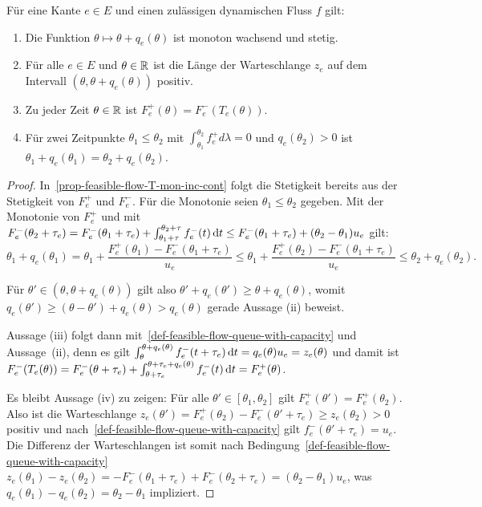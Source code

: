 \begin{proposition}\label{prop-feasible-flow}
	Für eine Kante $e\in E$ und einen zulässigen dynamischen Fluss $f$ gilt:
	\begin{enumerate}[label=(\roman*)]
		\item\label{prop-feasible-flow-T-mon-inc-cont} Die Funktion $\theta \mapsto \theta + q_e(\theta)$ ist monoton wachsend und stetig.
		\item\label{prop-feasible-flow-positive-queue} Für alle $e\in E$ und $\theta\in\mathbb{R}$ ist die Länge der Warteschlange $z_e$ auf dem Intervall $(\theta, \theta + q_e(\theta))$ positiv.
		\item\label{prop-feasible-flow-det-outflow} Zu jeder Zeit $\theta\in\mathbb{R}$ ist $F_e^+(\theta) = F_e^-(T_e(\theta))$.
		\item\label{prop-feasible-flow-queue-delay} Für zwei Zeitpunkte $\theta_1 \leq \theta_2$ mit $\int_{\theta_1}^{\theta_2} f^+_e d\lambda = 0$ und $q_e(\theta_2)>0$ ist $\theta_1 + q_e(\theta_1) = \theta_2 + q_e(\theta_2)$.
	\end{enumerate}
\end{proposition}
\begin{proof}
	In~\ref{prop-feasible-flow-T-mon-inc-cont} folgt die Stetigkeit bereits aus der Stetigkeit von $F_e^+$ und $F_e^-$.
	Für die Monotonie seien $\theta_1 \leq \theta_2$ gegeben.
	Mit der Monotonie von $F_e^+$ und mit $F_e^-(\theta_2 + \tau_e) = F_e^-(\theta_1+\tau_e) + \int_{\theta_1+\tau}^{\theta_2+\tau} f_e^-(t)\mathop{}\!\mathrm{d} t\leq F_e^-(\theta_1 + \tau_e) + (\theta_2 - \theta_1)u_e$ gilt: 
	$$
		\theta_1 + q_e(\theta_1)
		= \theta_1 + \frac{F_e^+(\theta_1) - F_e^-(\theta_1 + \tau_e)}{u_e}
		\leq \theta_1 + \frac{F_e^+(\theta_2) - F_e^-(\theta_1+\tau_e)}{u_e} \leq \theta_2 + q_e(\theta_2).
	$$
	
	Für $\theta'\in (\theta, \theta+q_e(\theta))$ gilt also $\theta' + q_e(\theta') \geq \theta + q_e(\theta)$, womit $q_e(\theta') \geq (\theta - \theta') + q_e(\theta) > q_e(\theta)$ gerade Aussage (ii) beweist.
	
	Aussage (iii) folgt dann mit~\ref{def-feasible-flow-queue-with-capacity} und Aussage~(ii), denn es gilt 
	$\int_{\theta}^{\theta + q_e(\theta)}f_e^-(t + \tau_e) \mathop{}\!\mathrm{d} t = q_e(\theta)  u_e = z_e(\theta)$ und damit ist $F_e^-(T_e(\theta)) = F_e^-(\theta+\tau_e) + \int_{\theta+\tau_e}^{\theta+\tau_e+q_e(\theta)}f_e^-(t)\mathop{}\!\mathrm{d} t = F_e^+(\theta)$.
	
	Es bleibt Aussage (iv) zu zeigen:
	Für alle $\theta'\in [\theta_1, \theta_2]$ gilt $F_e^+(\theta') = F_e^+(\theta_2)$.
	Also ist die Warteschlange $z_e(\theta') = F_e^+(\theta_2) - F_e^-(\theta' + \tau_e) \geq z_e(\theta_2) > 0$ positiv und nach~\ref{def-feasible-flow-queue-with-capacity} gilt $f_e^-(\theta' + \tau_e)=u_e$.
	Die Differenz der Warteschlangen ist somit nach Bedingung~\ref{def-feasible-flow-queue-with-capacity} 
	$z_e(\theta_1)-z_e(\theta_2)=-F^-_e(\theta_1 + \tau_e) + F^-_e(\theta_2 + \tau_e) = (\theta_2 - \theta_1)u_e$, was $q_e(\theta_1) - q_e(\theta_2) = \theta_2 - \theta_1$ impliziert.
\end{proof}